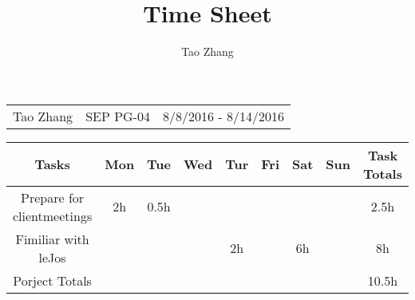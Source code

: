 \documentclass[a4paper]{article}
\title{Time Sheet}
\author{Tao Zhang}
\begin{document}
\maketitle

\begin{table}[h] 
\begin{tabular}{l c r}
Tao Zhang & SEP PG-04 & 8/8/2016 - 8/14/2016    \\
\end{tabular}
\end{table}

\begin{table}[h]
\centering
\begin{tabular}{ccccccccc}\renewcommand{\arraystretch}{4}
Tasks & Mon & Tue & Wed & Tur & Fri & Sat & Sun & Task Totals \\\hline
Prepare for clientmeetings & 2h & 0.5h & & & & & & 2.5h \\
Fimiliar with leJos & & & & 2h & & 6h & & 8h\\\hline
Porject Totals & & & & & & & & 10.5h\\\hline

\end{tabular}
\end{table}
\end{document}
